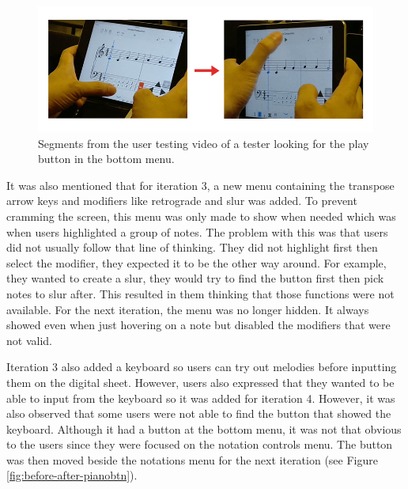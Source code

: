 				\begin{figure}[h]
					\centering
					\includegraphics[scale=0.5]{figures/video_menu.png}
				    \caption{Segments from the user testing video of a tester looking for the play button in the bottom menu.}
				    \label{fig:video_menu}
				\end{figure}

				It was also mentioned that for iteration 3, a new menu containing the transpose arrow keys and modifiers like retrograde and slur was added. To prevent cramming the screen, this menu was only made to show when needed which was when users highlighted a group of notes. The problem with this was that users did not usually follow that line of thinking. They did not highlight first then select the modifier, they expected it to be the other way around. For example, they wanted to create a slur, they would try to find the button first then pick notes to slur after. This resulted in them thinking that those functions were not available. For the next iteration, the menu was no longer hidden. It always showed even when just hovering on a note but disabled the modifiers that were not valid. 

				Iteration 3 also added a keyboard so users can try out melodies before inputting them on the digital sheet. However, users also expressed that they wanted to be able to input from the keyboard so it was added for iteration 4. However, it was also observed that some users were not able to find the button that showed the keyboard. Although it had a button at the bottom menu, it was not that obvious to the users since they were focused on the notation controls menu. The button was then moved beside the notations menu for the next iteration (see Figure \ref{fig:before-after-pianobtn}). 

